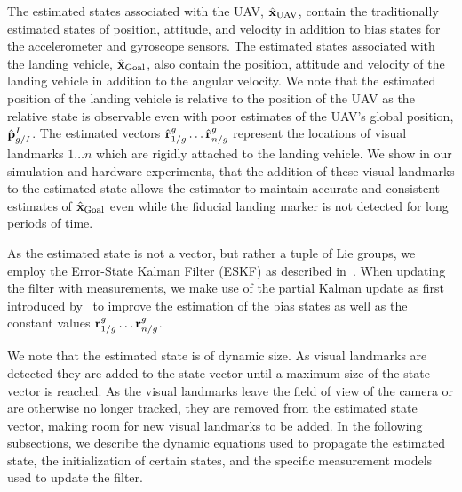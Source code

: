 The estimated states associated with the UAV, $\hat{\boldsymbol{\mathrm{x}}}_{\text{UAV}}$,
contain the traditionally estimated states of position, attitude, and velocity
in addition to bias states for the accelerometer and gyroscope sensors. The
estimated states associated with the landing vehicle,
$\hat{\boldsymbol{\mathrm{x}}}_{\text{Goal}}$, also contain the position, attitude and velocity
of the landing vehicle in addition to the angular velocity. We note that the
estimated position of the landing vehicle is relative to the position of the UAV
as the relative state is observable even with poor estimates of the UAV's global
position, $\hat{\boldsymbol{\mathrm{p}}}_{g/I}^I$.
The estimated vectors $\hat{\boldsymbol{\mathrm{r}}}_{1/g}^{g} \dots \hat{\boldsymbol{\mathrm{r}}}_{n/g}^{g}$ represent the
locations of visual landmarks $1 \dots n$ which are rigidly attached to the
landing vehicle. We show in our simulation and hardware experiments, that the
addition of these visual landmarks to the estimated state allows the estimator
to maintain accurate and consistent estimates of $\hat{\boldsymbol{\mathrm{x}}}_{\text{Goal}}$ even
while the fiducial landing marker is not detected for long periods of time. 


As the estimated state is not a vector, but rather a tuple of Lie groups, we
employ the Error-State Kalman Filter (ESKF) as described in~\cite{koch2017relative}. When
updating the filter with measurements, we make use of the partial Kalman update
as first introduced by~\cite{brink2017partial} to improve the estimation of the
bias states as well as the constant values $\vect{r}_{1/g}^{g} \dots
\vect{r}_{n/g}^{g}$.

We note
that the estimated state is of dynamic size. As visual landmarks are
detected they are added to the state vector until a maximum size of the state
vector is reached. As the visual landmarks leave the field of view of the camera
or are otherwise no longer tracked, they are removed from the estimated state
vector, making room for new visual landmarks to be added. In the following
subsections, we describe the dynamic equations used to propagate the estimated state, the
initialization of certain states, and the specific
measurement models used to update the filter.
